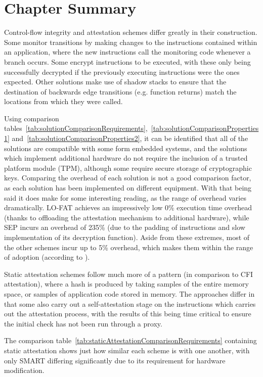 \section{Chapter Summary}
Control-flow integrity and attestation schemes differ greatly in their construction. Some monitor transitions by making changes to the instructions contained within an application, where the new instructions call the monitoring code whenever a branch occurs. Some encrypt instructions to be executed, with these only being successfully decrypted if the previously executing instructions were the ones expected. Other solutions make use of shadow stacks to ensure that the destination of backwards edge transitions (e.g. function returns) match the locations from which they were called.

Using comparison tables~\ref{tab:solutionComparisonRequirements},~\ref{tab:solutionComparisonProperties1} and~\ref{tab:solutionComparisonProperties2}, it can be identified that all of the solutions are compatible with some form embedded systems, and the solutions which implement additional hardware do not require the inclusion of a trusted platform module (TPM), although some require secure storage of cryptographic keys. Comparing the overhead of each solution is not a good comparison factor, as each solution has been implemented on different equipment. With that being said it does make for some interesting reading, as the range of overhead varies dramatically. LO-FAT \cite{Dessouky2017} achieves an impressively low 0\% execution time overhead (thanks to offloading the attestation mechanism to additional hardware), while SEP \cite{Lee2019} incurs an overhead of 235\% (due to the padding of instructions and slow implementation of its decryption function). Aside from these extremes, most of the other schemes incur up to 5\% overhead, which makes them within the range of adoption (according to \cite{Szekeres2013}).

Static attestation schemes follow much more of a pattern (in comparison to CFI attestation), where a hash is produced by taking samples of the entire memory space, or samples of application code stored in memory. The approaches differ in that some also carry out a self-attestation stage on the instructions which carries out the attestation process, with the results of this being time critical to ensure the initial check has not been run through a proxy.

The comparison table~\ref{tab:staticAttestationComparisonRequirements} containing static attestation shows just how similar each scheme is with one another, with only SMART \cite{For} differing significantly due to its requirement for hardware modification.